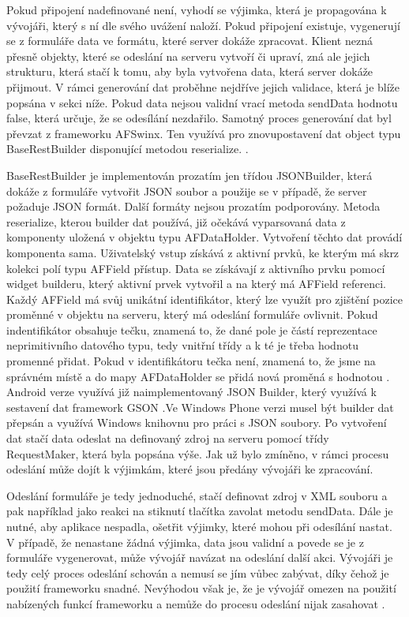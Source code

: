 Pokud připojení nadefinované není, vyhodí se výjimka, která je propagována k vývojáři, který s ní dle svého uvážení naloží. Pokud připojení existuje, vygenerují se z formuláře data ve formátu, které server dokáže zpracovat. Klient nezná přesně objekty, které se odeslání na serveru vytvoří či upraví, zná ale jejich strukturu, která stačí k tomu, aby byla vytvořena data, která server dokáže přijmout. V rámci generování dat proběhne nejdříve jejich validace, která je blíže popsána v sekci níže. Pokud data nejsou validní vrací metoda sendData hodnotu false, která určuje, že se odesílání nezdařilo. Samotný proces generování dat byl převzat z frameworku AFSwinx. Ten využívá pro znovupostavení dat object typu BaseRestBuilder disponující metodou reserialize. \cite{tomasek-thesis}. 

BaseRestBuilder je implementován prozatím jen třídou JSONBuilder, která dokáže z formuláře vytvořit JSON soubor a použije se v případě, že server požaduje JSON formát. Další formáty nejsou prozatím podporovány. Metoda reserialize, kterou builder dat používá, již očekává vyparsovaná data z komponenty uložená v objektu typu AFDataHolder. Vytvoření těchto dat provádí komponenta sama. Uživatelský vstup získává z aktivní prvků, ke kterým má skrz kolekci polí typu AFField přístup. Data se získávají z aktivního prvku pomocí widget builderu, který aktivní prvek vytvořil a na který má AFField referenci.  Každý AFField má svůj unikátní identifikátor, který lze využít pro zjištění pozice proměnné v objektu na serveru, který má odeslání formuláře ovlivnit. Pokud indentifikátor obsahuje tečku, znamená to, že dané pole je částí reprezentace neprimitivního datového typu, tedy vnitřní třídy a k té je třeba hodnotu promenné přidat. Pokud v identifikátoru tečka není, znamená to, že jsme na správném místě a do mapy AFDataHolder se přidá nová proměná s hodnotou \cite{tomasek-thesis}. Android verze využívá již naimplementovaný JSON Builder, který využívá k sestavení dat framework GSON \cite{gson}.Ve Windows Phone verzi musel být builder dat přepsán a využívá Windows knihovnu pro práci s JSON soubory. Po vytvoření dat stačí data odeslat na definovaný zdroj na serveru pomocí třídy RequestMaker, která byla popsána výše. Jak už bylo zmíněno, v rámci procesu odeslání může dojít k výjimkám, které jsou předány vývojáři ke zpracování. 

Odeslání formuláře je tedy jednoduché, stačí definovat zdroj v XML souboru a pak například jako reakci na stiknutí tlačítka zavolat metodu sendData. Dále je nutné, aby aplikace nespadla, ošetřit výjimky, které mohou při odesílání nastat. V případě, že nenastane žádná výjimka, data jsou validní a povede se je z formuláře vygenerovat, může vývojář navázat na odeslání další akci. Vývojáři je tedy celý proces odeslání schován a nemusí se jím vůbec zabývat, díky čehož je použití frameworku snadné. Nevýhodou však je, že je vývojář omezen na použití nabízených funkcí frameworku a nemůže do procesu odeslání nijak zasahovat \cite{tomasek-thesis}. 

